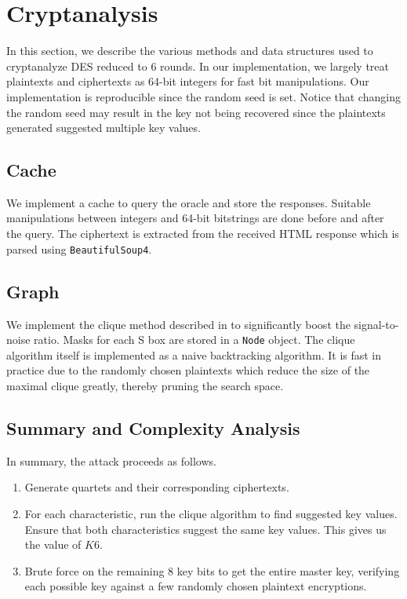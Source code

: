 \documentclass[journal,12pt,twocolumn]{IEEEtran}
\begin{document}
\section{Cryptanalysis}
\label{sec:recovery}

In this section, we describe the various methods and data structures used to
cryptanalyze DES reduced to 6 rounds. In our implementation, we largely treat
plaintexts and ciphertexts as 64-bit integers for fast bit manipulations. Our
implementation is reproducible since the random seed is set. Notice that
changing the random seed may result in the key not being recovered since the
plaintexts generated suggested multiple key values.

\subsection{Cache}
\label{subsec:cache}

We implement a cache to query the oracle and store the responses. Suitable
manipulations between integers and 64-bit bitstrings are done before and after
the query. The ciphertext is extracted from the received HTML response which is
parsed using \texttt{BeautifulSoup4}.

\subsection{Graph}
\label{subsec:graph}

We implement the clique method described in
\cite{bihamDifferentialCryptanalysisDESlike1991} to significantly boost the
signal-to-noise ratio. Masks for each S box are stored in a \texttt{Node}
object. The clique algorithm itself is implemented as a naive backtracking
algorithm. It is fast in practice due to the randomly chosen plaintexts which
reduce the size of the maximal clique greatly, thereby pruning the search space.

\subsection{Summary and Complexity Analysis}
\label{subsec:summary}

In summary, the attack proceeds as follows.

\begin{enumerate}
    \item Generate quartets and their corresponding ciphertexts.
    \item For each characteristic, run the clique algorithm to find suggested
    key values. Ensure that both characteristics suggest the same key values.
    This gives us the value of \(K6\).
    \item Brute force on the remaining 8 key bits to get the entire master key,
    verifying each possible key against a few randomly chosen plaintext
    encryptions.
\end{enumerate}
\end{document}

